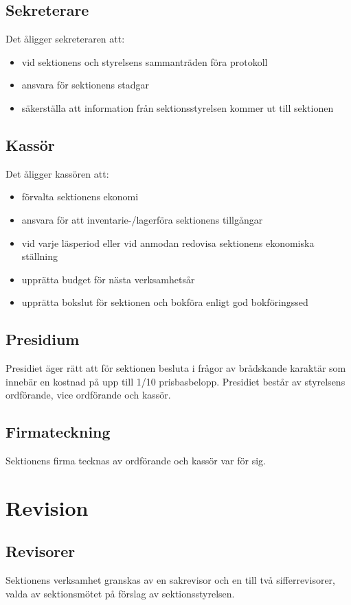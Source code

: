 \documentclass{datateknologsektionen-document}
\begin{document}
\subsection{Sekreterare}
Det åligger sekreteraren att:
\begin{itemize}
  \item vid sektionens och styrelsens sammanträden föra protokoll
  \item ansvara för sektionens stadgar
  \item säkerställa att information från sektionsstyrelsen kommer ut till sektionen
\end{itemize}

\subsection{Kassör}
Det åligger kassören att:
\begin{itemize}
  \item förvalta sektionens ekonomi
  \item ansvara för att inventarie-/lagerföra sektionens tillgångar
  \item vid varje läsperiod eller vid anmodan redovisa sektionens ekonomiska ställning
  \item upprätta budget för nästa verksamhetsår
  \item upprätta bokslut för sektionen och bokföra enligt god bokföringssed
\end{itemize}

\subsection{Presidium}
Presidiet äger rätt att för sektionen besluta i frågor av brådskande karaktär som
innebär en kostnad på upp till 1/10 prisbasbelopp. Presidiet består av styrelsens
ordförande, vice ordförande och kassör.

\subsection{Firmateckning}
Sektionens firma tecknas av ordförande och kassör var för sig.

\section{Revision}
\subsection{Revisorer}
Sektionens verksamhet granskas av en sakrevisor och en till två sifferrevisorer, valda
av sektionsmötet på förslag av sektionsstyrelsen.
\end{document}
